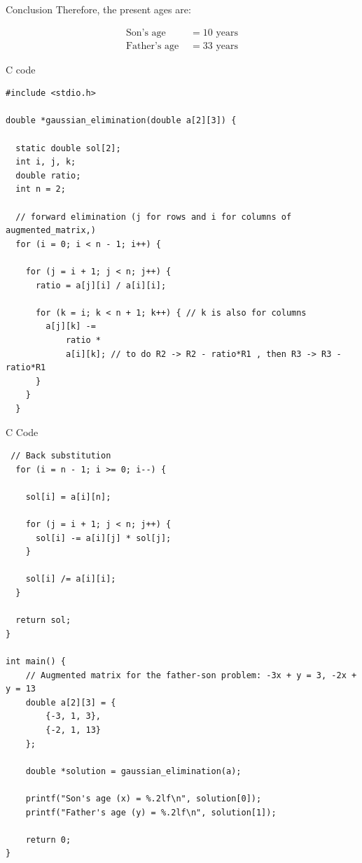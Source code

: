 \documentclass{beamer}
\numberwithin{equation}{section}
\theoremstyle{remark}
\begin{document}
\begin{frame}{Conclusion}
Therefore, the present ages are:

\begin{align*}
\text{Son's age } &= 10 \text{ years} \\
\text{Father's age } &= 33 \text{ years}
\end{align*}
\end{frame}
\begin{frame}[fragile]{C code}
\begin{lstlisting}
#include <stdio.h>

double *gaussian_elimination(double a[2][3]) {

  static double sol[2];
  int i, j, k;
  double ratio;
  int n = 2;

  // forward elimination (j for rows and i for columns of augmented_matrix,)
  for (i = 0; i < n - 1; i++) {

    for (j = i + 1; j < n; j++) {
      ratio = a[j][i] / a[i][i];

      for (k = i; k < n + 1; k++) { // k is also for columns
        a[j][k] -=
            ratio *
            a[i][k]; // to do R2 -> R2 - ratio*R1 , then R3 -> R3 -ratio*R1
      }
    }
  }
\end{lstlisting}
\end{frame}
\begin{frame}[fragile]{C Code}
\begin{lstlisting}
 // Back substitution
  for (i = n - 1; i >= 0; i--) {

    sol[i] = a[i][n];

    for (j = i + 1; j < n; j++) {
      sol[i] -= a[i][j] * sol[j];
    }

    sol[i] /= a[i][i];
  }

  return sol;
}

int main() {
    // Augmented matrix for the father-son problem: -3x + y = 3, -2x + y = 13
    double a[2][3] = {
        {-3, 1, 3},
        {-2, 1, 13}
    };

    double *solution = gaussian_elimination(a);

    printf("Son's age (x) = %.2lf\n", solution[0]);
    printf("Father's age (y) = %.2lf\n", solution[1]);

    return 0;
}
\end{lstlisting}
\end{frame}
\end{document}
